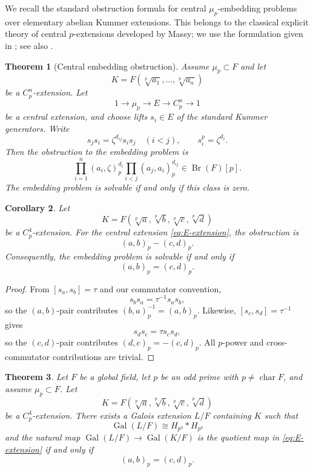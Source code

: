 \documentclass[12pt]{amsart}
\newtheorem{theorem}{Theorem}[section]
\newtheorem{corollary}[theorem]{Corollary}
\theoremstyle{definition}
\theoremstyle{remark}
\DeclareMathOperator{\Gal}{Gal}
\DeclareMathOperator{\Br}{Br}
\newcommand{\Hp}{H_{p^3}}
\begin{document}
We recall the standard obstruction formula for central $\mu_p$-embedding
problems over elementary abelian Kummer extensions. This belongs to the
classical explicit theory of central $p$-extensions developed by Massy; we
use the formulation given in \cite[Corollary~6.1.6]{Ledet}; see also
\cite{Massy}.

\begin{theorem}[Central embedding obstruction]\label{thm:obstruction}
Assume $\mu_p\subset F$ and let
\[
 K=F(\sqrt[p]{a_1},\ldots,\sqrt[p]{a_n})
\]
be a $C_p^n$-extension. Let
\[
 1\longrightarrow\mu_p\longrightarrow E\longrightarrow C_p^n\longrightarrow1
\]
be a central extension, and choose lifts $s_i\in E$ of the standard Kummer
generators. Write
\[
 s_j s_i=\zeta^{d_{ij}}s_i s_j\quad(i<j),
 \qquad
 s_i^p=\zeta^{d_i}.
\]
Then the obstruction to the embedding problem is
\[
 \prod_{i=1}^n(a_i,\zeta)_p^{d_i}
 \prod_{i<j}(a_j,a_i)_p^{d_{ij}}
 \in\Br(F)[p].
\]
The embedding problem is solvable if and only if this class is zero.
\end{theorem}

\begin{corollary}\label{cor:obstruction-E}
Let
\[
 K=F(\sqrt[p]{a},\sqrt[p]{b},\sqrt[p]{c},\sqrt[p]{d})
\]
be a $C_p^4$-extension. For the central extension
\eqref{eq:E-extension}, the obstruction is
\[
 (a,b)_p-(c,d)_p.
\]
Consequently, the embedding problem is solvable if and only if
\[
 (a,b)_p=(c,d)_p.
\]
\end{corollary}

\begin{proof}
From $[s_a,s_b]=\tau$ and our commutator convention,
\[
 s_b s_a=\tau^{-1}s_a s_b,
\]
so the $(a,b)$-pair contributes
$(b,a)_p^{-1}=(a,b)_p$. Likewise,
$[s_c,s_d]=\tau^{-1}$ gives
\[
 s_d s_c=\tau s_c s_d,
\]
so the $(c,d)$-pair contributes
$(d,c)_p=-(c,d)_p$. All $p$-power and cross-commutator contributions are
trivial.
\end{proof}

\begin{theorem}\label{thm:global-realizability}
Let $F$ be a global field, let $p$ be an odd prime with
$p\neq\operatorname{char}F$, and assume $\mu_p\subset F$. Let
\[
 K=F(\sqrt[p]{a},\sqrt[p]{b},\sqrt[p]{c},\sqrt[p]{d})
\]
be a $C_p^4$-extension. There exists a Galois extension $L/F$ containing
$K$ such that
\[
 \Gal(L/F)\cong\Hp*\Hp
\]
and the natural map $\Gal(L/F)\to\Gal(K/F)$ is the quotient map in
\eqref{eq:E-extension} if and only if
\[
 (a,b)_p=(c,d)_p.
\]
\end{theorem}
\end{document}
